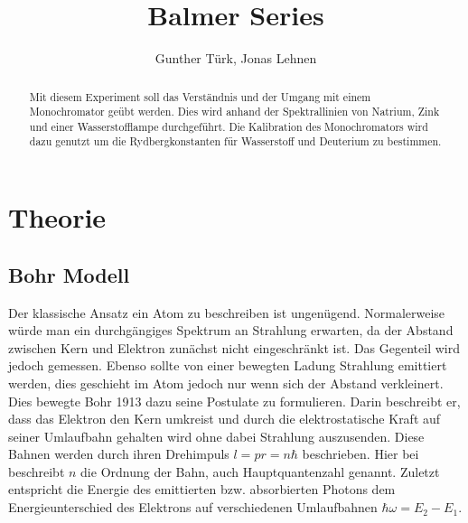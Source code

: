 \documentclass[]{article}
\title{Balmer Series}
\author{Gunther T\"urk, Jonas Lehnen}
\begin{document}
\maketitle
\begin{abstract}
Mit diesem Experiment soll das Verständnis und der Umgang mit einem Monochromator geübt werden. Dies wird anhand der Spektrallinien von Natrium, Zink und einer Wasserstofflampe durchgeführt. Die Kalibration des Monochromators wird dazu genutzt um die Rydbergkonstanten für Wasserstoff und Deuterium zu bestimmen.

\end{abstract}

\tableofcontents

\newpage
\section{Theorie}
\subsection{Bohr Modell}
Der klassische Ansatz ein Atom zu beschreiben ist ungenügend. Normalerweise würde man ein durchgängiges Spektrum an Strahlung erwarten, da der Abstand zwischen Kern und Elektron zunächst nicht eingeschränkt ist. Das Gegenteil wird jedoch gemessen. Ebenso sollte von einer bewegten Ladung Strahlung emittiert werden, dies geschieht im Atom jedoch nur wenn sich der Abstand verkleinert. Dies bewegte Bohr 1913 dazu seine Postulate zu formulieren. Darin beschreibt er, dass das Elektron den Kern umkreist und durch die elektrostatische Kraft auf seiner Umlaufbahn gehalten wird ohne dabei Strahlung auszusenden. Diese Bahnen werden durch ihren Drehimpuls $l = pr = n\hbar$ beschrieben. Hier bei beschreibt $n$ die Ordnung der Bahn, auch Hauptquantenzahl genannt. Zuletzt entspricht die Energie des emittierten bzw. absorbierten Photons dem Energieunterschied des Elektrons auf verschiedenen Umlaufbahnen $ \hbar \omega = E_2 - E_1$. 
\end{document}
